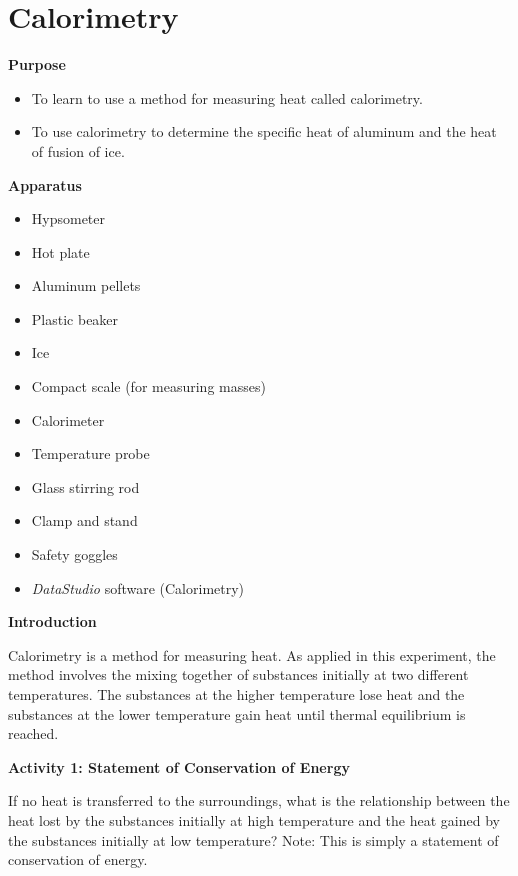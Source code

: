 \setcounter{equation}{0}
\setcounter{figure}{0}

\section{Calorimetry}

\makelabheader %

\textbf{Purpose}

\begin{itemize}

\item To learn to use a method for measuring heat called calorimetry.

\item To use calorimetry to determine the specific heat of aluminum and
the heat of fusion of ice.

\end{itemize}

\textbf{Apparatus}

\begin{itemize}
\item Hypsometer
\item Hot plate 
\item Aluminum pellets 
\item Plastic beaker
\item Ice 
\item Compact scale (for measuring masses)
\item Calorimeter
\item Temperature probe
\item Glass stirring rod
\item Clamp and stand
\item Safety goggles
\item \textit{DataStudio} software (Calorimetry)
\end{itemize}
\textbf{Introduction} 

Calorimetry is a method for measuring heat. As applied in this experiment,
the method involves the mixing together of substances initially at
two different temperatures. The substances at the higher temperature
lose heat and the substances at the lower temperature gain heat until
thermal equilibrium is reached.

\textbf{Activity 1: Statement of Conservation of Energy}

If no heat is transferred to the surroundings, what is the relationship
between the heat lost by the substances initially at high temperature
and the heat gained by the substances initially at low temperature?
Note: This is simply a statement of conservation of energy.

